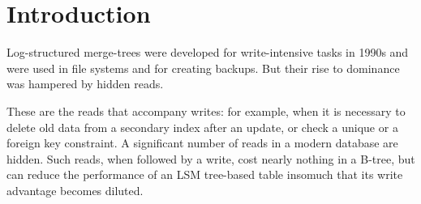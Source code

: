 \documentclass{vldb}
\begin{document}




\section{Introduction}
Log-structured merge-trees were developed for write-intensive tasks in 1990s
and were used in file systems and for creating backups. But their rise to dominance
was hampered by hidden reads.

These are the reads that accompany writes: for example, when it is necessary to delete
old data from a secondary index after an update, or check a unique or a foreign
key constraint. A significant number of reads in a modern database are hidden.
Such reads, when followed by a write, cost nearly nothing in a B-tree, but can
reduce the performance of an LSM tree-based table insomuch that its write
advantage becomes diluted.
\end{document}
